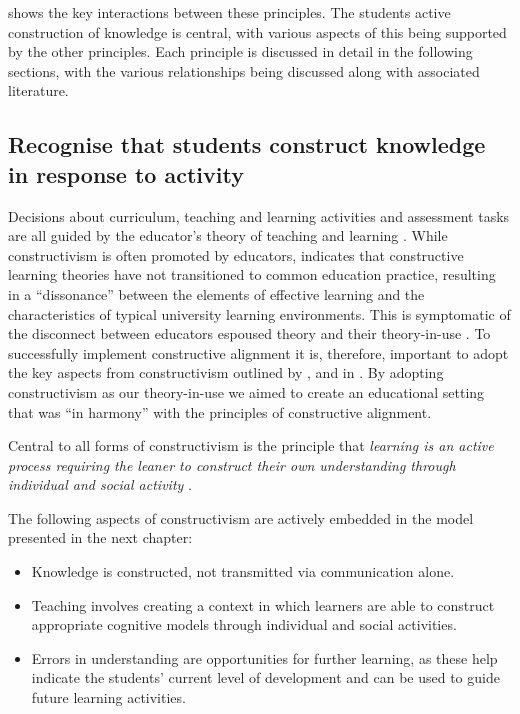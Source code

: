  shows the key interactions between these principles. The students active construction of knowledge is central, with various aspects of this being supported by the other principles. Each principle is discussed in detail in the following sections, with the various relationships being discussed along with associated literature.

\bigskip
\subsection{Recognise that students construct knowledge in response to activity} %
\label{ssub:ideas_adopted_from_constructivism}

Decisions about curriculum, teaching and learning activities and assessment tasks are all guided by the educator's theory of teaching and learning \cite{Argyris:1976,Ramsden:1992}. While constructivism is often promoted by educators, \citet{Phillips:2005} indicates that constructive learning theories have not transitioned to common education practice, resulting in a ``dissonance'' between the elements of effective learning and the characteristics of typical university learning environments. This is symptomatic of the disconnect between educators espoused theory and their theory-in-use \cite{Argyris:1976}. To successfully implement constructive alignment it is, therefore, important to adopt the key aspects from constructivism outlined by \citet{Biggs:1996c}, \citet{Biggs:1997} and in \citet{Biggs:2007}. By adopting constructivism as our theory-in-use we aimed to create an educational setting that was ``in harmony'' with the principles of constructive alignment.

Central to all forms of constructivism is the principle that \emph{learning is an active process requiring the leaner to construct their own understanding through individual and social activity} \cite{Biggs:1996c,Duffy:1996,Duffy:1992,Glasersfeld:1989,Steffe:1995}. 

The following aspects of constructivism are actively embedded in the model presented in the next chapter:
\begin{itemize}[noitemsep,nolistsep]
	\item Knowledge is constructed, not transmitted via communication alone.
	\item Teaching involves creating a context in which learners are able to construct appropriate cognitive models through individual and social activities.
	\item Errors in understanding are opportunities for further learning, as these help indicate the students' current level of development and can be used to guide future learning activities.
\end{itemize}

